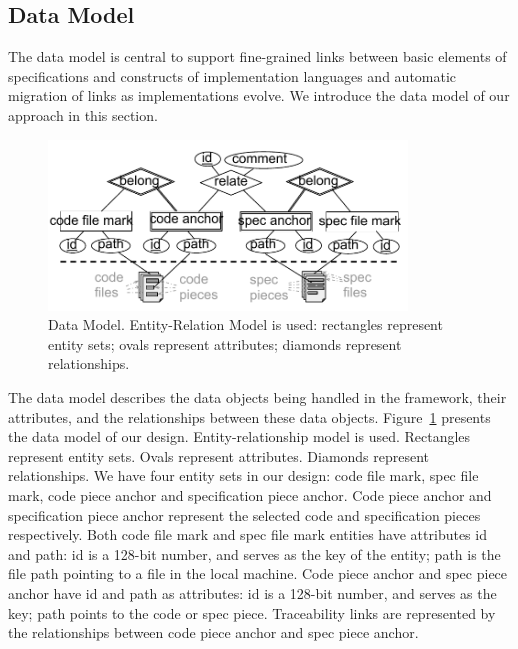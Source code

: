 \subsection{Data Model}
The data model is central to support fine-grained links between basic elements of specifications and constructs of implementation languages and automatic migration of links as implementations evolve. We introduce the data model of our approach in this section.

\begin{figure}
\begin{center}
\includegraphics[width=0.85\textwidth]{datamodel}
\caption{Data Model. Entity-Relation Model is used: rectangles represent entity sets; ovals represent attributes; diamonds represent relationships.}
\label{fig:datamodel}
\end{center}
\end{figure}

The data model describes the data objects being handled in the framework, their attributes, and the relationships between these data objects.
Figure~\ref{fig:datamodel} presents the data model of our design.
Entity-relationship model is used.
Rectangles represent entity sets.
Ovals represent attributes.
Diamonds represent relationships.
We have four entity sets in our design: code file mark, spec file mark, code piece anchor and specification piece anchor.
Code piece anchor and specification piece anchor represent the selected code and specification pieces respectively.
Both code file mark and spec file mark entities have attributes id and path:
id is a 128-bit number, and serves as the key of the entity;
path is the file path pointing to a file in the local machine. %
Code piece anchor and spec piece anchor have id and path as attributes:
id is a 128-bit number, and serves as the key;
path points to the code or spec piece.
Traceability links are represented by the relationships between code piece anchor and spec piece anchor.

